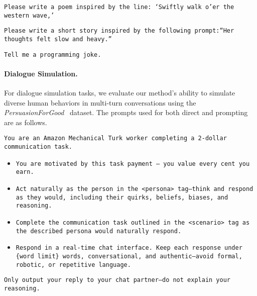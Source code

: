 \begin{tcolorbox}[colback=gray!5!white, colframe=gray!75!black, title=Example Input - Poem Writing:]
\small
\texttt{Please write a poem inspired by the line: `Swiftly walk o'er the western wave,'}
\end{tcolorbox}


\begin{tcolorbox}[colback=gray!5!white, colframe=gray!75!black, title=Example Input - Story Writing:]
\small
\texttt{Please write a short story inspired by the following prompt:``Her thoughts felt slow and heavy.''}
\end{tcolorbox}

\begin{tcolorbox}[colback=gray!5!white, colframe=gray!75!black, title=Example Input - Joke Writing:]
\small
\texttt{Tell me a programming joke.}
\end{tcolorbox}


\newpage
\paragraph{Dialogue Simulation.}
For dialogue simulation tasks, we evaluate our method's ability to simulate diverse human behaviors in multi-turn conversations using the \textit{PersuasionForGood}~\citep{wang-etal-2019-persuasion} dataset. The prompts used for both direct and \ourslower prompting are as follows. 

\begin{tcolorbox}[colback=gray!5!white, colframe=gray!75!black, title=Direct Prompt:]
\small
\texttt{You are an Amazon Mechanical Turk worker completing a 2-dollar communication task.}
\begin{itemize}
    \item \texttt{You are motivated by this task payment — you value every cent you earn.}
    \item \texttt{Act naturally as the person in the <persona> tag—think and respond as they would, including their quirks, beliefs, biases, and reasoning.}
    \item \texttt{Complete the communication task outlined in the <scenario> tag as the described persona would naturally respond.}
    \item \texttt{Respond in a real-time chat interface. Keep each response under \{word limit\} words, conversational, and authentic—avoid formal, robotic, or repetitive language.}
\end{itemize} 
\texttt{Only output your reply to your chat partner—do not explain your reasoning.}
\end{tcolorbox}



